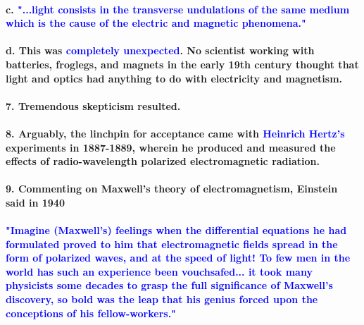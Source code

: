 \documentclass{article}
\begin{document}
\paragraph{\indent c. \textcolor{blue}{"...light consists in the transverse undulations of the same medium which is the cause of the electric and magnetic phenomena."}}
\paragraph{\indent d. This was \textcolor{blue}{completely unexpected}. No scientist working with batteries, froglegs, and magnets in the early 19th century thought that light and optics had anything to do with electricity and magnetism.}
\paragraph{7. Tremendous skepticism resulted.}
\paragraph{8. Arguably, the linchpin for acceptance came with \textcolor{blue}{Heinrich Hertz's} experiments in 1887-1889, wherein he produced and measured the effects of radio-wavelength polarized electromagnetic radiation.}
\paragraph{9. Commenting on Maxwell's theory of electromagnetism, Einstein said in 1940}
\paragraph{\textcolor{blue}{"Imagine (Maxwell's) feelings when the differential equations he had formulated proved to him that electromagnetic fields spread in the form of polarized waves, and at the speed of light! To few men in the world has such an experience been vouchsafed... it took many physicists some decades to grasp the full significance of Maxwell's discovery, so bold was the leap that his genius forced upon the conceptions of his fellow-workers."}}
\end{document}
